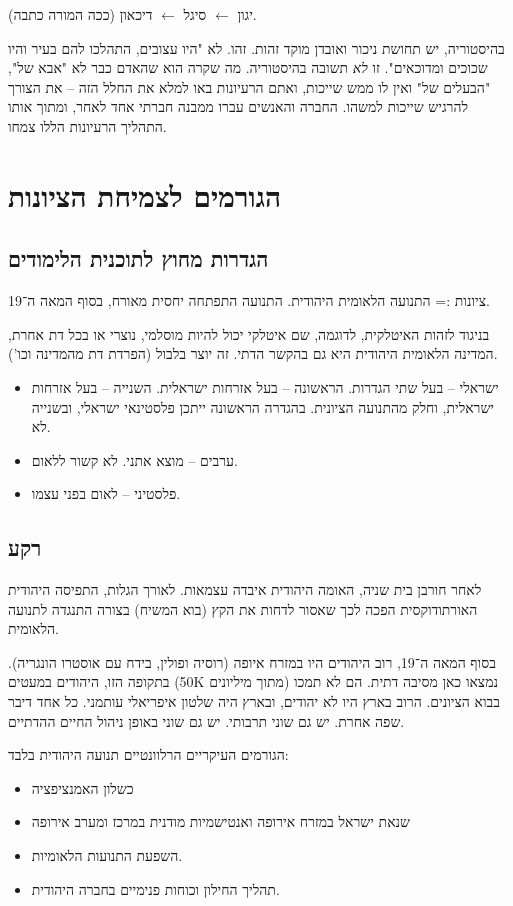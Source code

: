 \documentclass[a4paper]{book}
\begin{document}
	יגון $\leftarrow$ סיגל $\leftarrow$ דיכאון (ככה המורה כתבה). 
	
	בהיסטוריה, יש תחושת ניכור ואובדן מוקד זהות. זהו. לא "היו עצובים, התהלכו להם בעיר והיו שכוכים ומדוכאים". זו \textit{לא} תשובה בהיסטוריה. מה שקרה הוא שהאדם כבר לא "אבא של", "הבעלים של" ואין לו ממש שייכות, ואתם הרעיונות באו למלא את החלל הזה – את הצורך להרגיש שייכות למשהו. החברה והאנשים עברו ממבנה חברתי אחד לאחר, ומתוך אותו התהליך הרעיונות הללו צמחו. 
	
	\section{הגורמים לצמיחת הציונות}
	\subsection{הגדרות מחוץ לתוכנית הלימודים}
	ציונות := התנועה הלאומית היהודית. התנועה התפתחה יחסית מאורח, בסוף המאה ה־19. 
	
	בניגוד לזהות האיטלקית, לדוגמה, שם איטלקי יכול להיות מוסלמי, נוצרי או בכל דת אחרת, המדינה הלאומית היהודית היא גם בהקשר הדתי. זה יוצר בלבול (הפרדת דת מהמדינה וכו'). 
	
	\begin{itemize}
		\item ישראלי – בעל שתי הגדרות. הראשונה – בעל אזרחות ישראלית. השנייה – בעל אזרחות ישראלית, וחלק מהתנועה הציונית. בהגדרה הראשונה ייתכן פלסטינאי ישראלי, ובשנייה לא. 
		\item ערבים – מוצא אתני. לא קשור ללאום. 
		\item פלסטיני – לאום בפני עצמו. 
	\end{itemize}
	
	\subsection{רקע}
	לאחר חורבן בית שניה, האומה היהודית איבדה עצמאות. לאורך הגלות, התפיסה היהודית האורתודוקסית הפכה לכך שאסור לדחות את הקץ (בוא המשיח) בצורה התנגדה לתנועה הלאומית. 
	
	בסוף המאה ה־19, רוב היהודים היו במזרח איופה (רוסיה ופולין, בידח עם אוסטרו הונגריה). בתקופה הזו, היהודים במעטים (50K מתוך מיליונים) נמצאו כאן מסיבה דתית. הם לא תמכו בבוא הציונים. הרוב בארץ היו לא יהודים, ובארץ היה שלטון איפריאלי עותמני. כל אחד דיבר שפה אחרת. יש גם שוני תרבותי. יש גם שוני באופן ניהול החיים ההדתיים. 
	
	
	הגורמים העיקריים הרלוונטיים תנועה היהודית בלבד: 
	\begin{itemize}
		\item כשלון האמנציפציה
		\item שנאת ישראל במזרח אירופה ואנטישמיות מודנית במרכז ומערב אירופה
		\item השפעת התנועות הלאומיות. 
		\item תהליך החילון וכוחות פנימיים בחברה היהודית. 
	\end{itemize}
	
\end{document}
